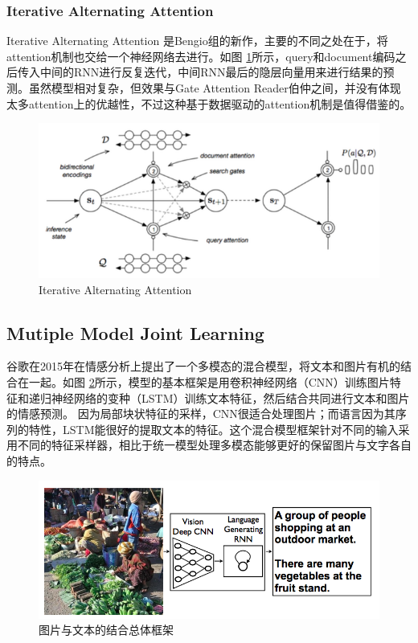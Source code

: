 \documentclass[10pt, titlepage]{article}
\begin{document}
		\subsubsection{Iterative Alternating Attention}
		Iterative Alternating Attention \cite{sordoni2016iterative}是Bengio组的新作，主要的不同之处在于，将attention机制也交给一个神经网络去进行。如图 \ref{fig:IterativeAlternatingAttention}所示，query和document编码之后传入中间的RNN进行反复迭代，中间RNN最后的隐层向量用来进行结果的预测。虽然模型相对复杂，但效果与Gate Attention Reader伯仲之间，并没有体现太多attention上的优越性，不过这种基于数据驱动的attention机制是值得借鉴的。
			\begin{figure}[htb]
			\centering
			\includegraphics[width=0.6\columnwidth]{figs/6.png}
			\caption{Iterative Alternating Attention}
			\label{fig:IterativeAlternatingAttention}
			\end{figure}

	\subsection{Mutiple Model Joint Learning}

		谷歌\cite{vinyals2015show}在2015年在情感分析上提出了一个多模态的混合模型，将文本和图片有机的结合在一起。如图 \ref{fig:multisample1}所示，模型的基本框架是用卷积神经网络（CNN）训练图片特征和递归神经网络的变种（LSTM）训练文本特征，然后结合共同进行文本和图片的情感预测。
		因为局部块状特征的采样，CNN很适合处理图片；而语言因为其序列的特性，LSTM能很好的提取文本的特征。这个混合模型框架针对不同的输入采用不同的特征采样器，相比于统一模型处理多模态能够更好的保留图片与文字各自的特点。
			\begin{figure}[htb]
				\centering
				\includegraphics[width=0.6\columnwidth]{figs/8.png}
				\caption{图片与文本的结合总体框架}
				\label{fig:multisample1}
			\end{figure}
		
\end{document}
